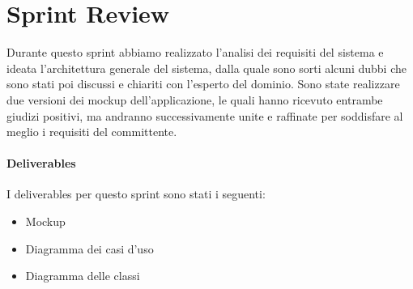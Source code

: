 \section{Sprint Review}
Durante questo sprint abbiamo realizzato l'analisi dei requisiti del sistema e ideata l'architettura generale del sistema, dalla quale sono sorti alcuni dubbi che sono stati poi discussi e chiariti con l'esperto del dominio. Sono state realizzare due versioni dei mockup dell'applicazione, le quali hanno ricevuto entrambe giudizi positivi, ma andranno successivamente unite e raffinate per soddisfare al meglio i requisiti del committente.
\paragraph{Deliverables} 
I deliverables per questo sprint sono stati i seguenti:
\begin{itemize}
    \item Mockup
    \item Diagramma dei casi d'uso
    \item Diagramma delle classi
\end{itemize}
